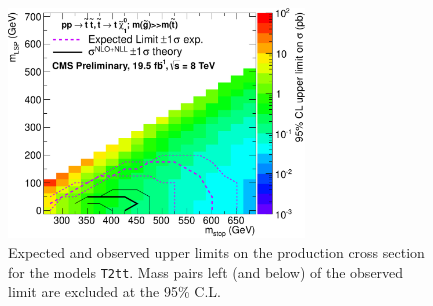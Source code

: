 \begin{figure}[h!]
  \begin{center}
      \includegraphics[width=0.70\textwidth,clip=true,]{figures/limits/merged/T2tt/v6/CLs_frequentist_T2tt_2012pf_1b_ge4j_2b_ge4j_xsLimit}
    \caption{\label{fig:upperLimits-t2tt}Expected and observed upper limits on the production cross section 
    for the models \texttt{T2tt}. Mass pairs left (and below) of the observed limit are excluded at the 95\% C.L.}
  \end{center}
\end{figure}

\FloatBarrier

